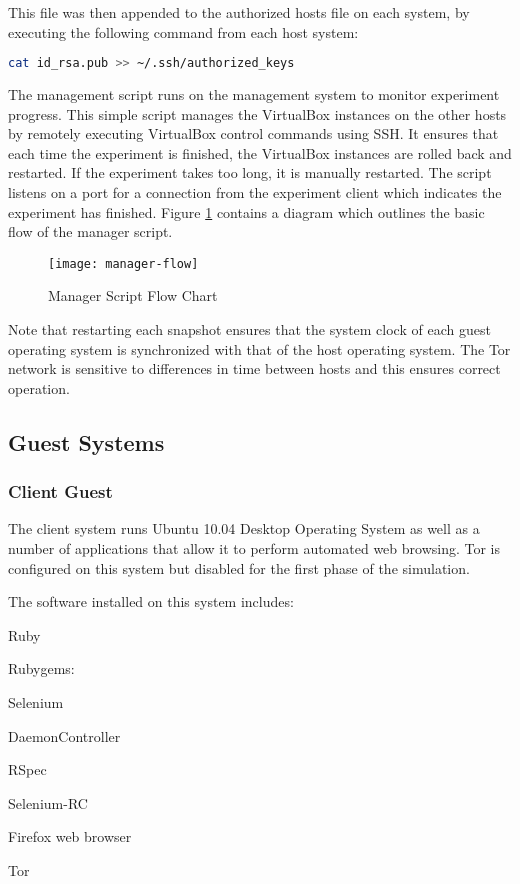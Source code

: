 This file was then appended to the authorized hosts file on each system, by
executing the following command from each host system:
\begin{lstlisting}[language=sh]
  cat id_rsa.pub >> ~/.ssh/authorized_keys
\end{lstlisting}

The management script runs on the management system to monitor experiment
progress. This simple script manages the VirtualBox instances on the other hosts
by remotely executing VirtualBox control commands using SSH. It ensures that
each time the experiment is finished, the VirtualBox instances are rolled back
and restarted. If the experiment takes too long, it is manually restarted. The
script listens on a port for a connection from the experiment client which
indicates the experiment has finished. Figure \ref{manager-flow-diagram}
contains a diagram which outlines the basic flow of the manager script.

\begin{figure}[H]
  \centering\texttt{[image: manager-flow]}
  \caption{Manager Script Flow Chart}
  \label{manager-flow-diagram}
\end{figure}

Note that restarting each snapshot ensures that the system clock of each guest
operating system is synchronized with that of the host operating system. The
Tor network is sensitive to differences in time between hosts and this ensures
correct operation.

\subsection{Guest Systems}

\subsubsection{Client Guest}

The client system runs Ubuntu 10.04 Desktop Operating System as well as a
number of applications that allow it to perform automated web browsing. Tor is
configured on this system but disabled for the first phase of the simulation.

The software installed on this system includes:

\begin{itemize*}
  \item Ruby
  \item Rubygems:
    \begin{itemize*}
      \item Selenium
      \item DaemonController
      \item RSpec
    \end{itemize*}
  \item Selenium-RC
  \item Firefox web browser
  \item Tor
\end{itemize*}

